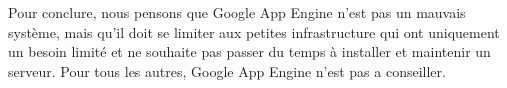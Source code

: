 \documentclass{article}
\begin{document}
Pour conclure, nous pensons que Google App Engine n'est pas un mauvais système, mais qu'il doit se limiter aux petites infrastructure qui ont uniquement un besoin limité et ne souhaite pas passer du temps à installer et maintenir un serveur. Pour tous les autres, Google App Engine n'est pas a conseiller.
\end{document}

